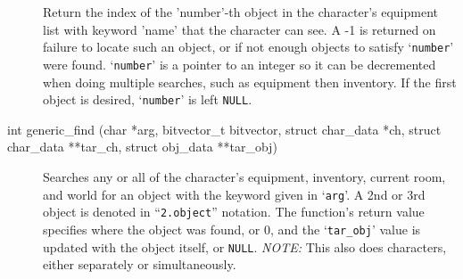 \documentclass[11pt]{article}
\begin{document}
\begin{description}
Return the index of the 'number'-th object in the character's equipment list with keyword 'name' that the character can see.  A -1 is returned on failure to locate such an object, or if not enough objects to satisfy `\texttt{number}' were found. `\texttt{number}' is a pointer to an integer so it can be decremented when doing multiple searches, such as equipment then inventory. If the first object is desired, `\texttt{number}' is left \texttt{NULL}.
\item[int generic\_find (char *arg, bitvector\_t bitvector, struct char\_data *ch, struct char\_data **tar\_ch, struct obj\_data **tar\_obj)]
Searches any or all of the character's equipment, inventory, current room, and world for an object with the keyword given in `\texttt{arg}'.  A 2nd or 3rd object is denoted in ``\texttt{2.object}'' notation.  The function's return value specifies where the object was found, or 0, and the `\texttt{tar\_obj}' value is updated with the object itself, or \texttt{NULL}. {\em NOTE:} This also does characters, either separately or simultaneously.
\end{description}
\end{document}
